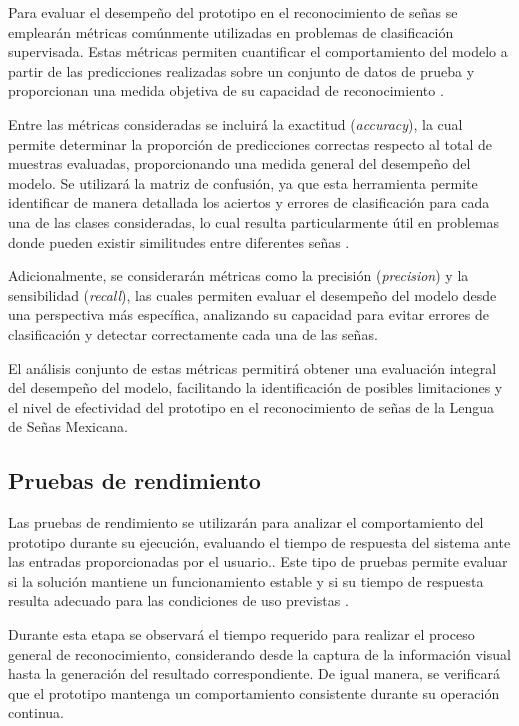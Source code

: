 	Para evaluar el desempeño del prototipo en el reconocimiento de señas se
	emplearán métricas comúnmente utilizadas en problemas de clasificación
	supervisada. Estas métricas permiten cuantificar el comportamiento del modelo
	a partir de las predicciones realizadas sobre un conjunto de datos de prueba
	y proporcionan una medida objetiva de su capacidad de reconocimiento
	\cite{bishop2006,geron2019}.
	
	Entre las métricas consideradas se incluirá la exactitud (\textit{accuracy}),
	la cual permite determinar la proporción de predicciones correctas respecto al
	total de muestras evaluadas, proporcionando una medida general del desempeño
	del modelo. Se utilizará la matriz de confusión, ya que esta
	herramienta permite identificar de manera detallada los aciertos y errores de
	clasificación para cada una de las clases consideradas, lo cual resulta
	particularmente útil en problemas donde pueden existir similitudes entre
	diferentes señas \cite{geron2019,goodfellow2016}.
	
	Adicionalmente, se considerarán métricas como la precisión (\textit{precision})
	y la sensibilidad (\textit{recall}), las cuales permiten evaluar el desempeño
	del modelo desde una perspectiva más específica, analizando su capacidad para
	evitar errores de clasificación y detectar correctamente cada una de las
	señas.
	
	El análisis conjunto de estas métricas permitirá obtener una evaluación
	integral del desempeño del modelo, facilitando la identificación de posibles
	limitaciones y el nivel de efectividad del prototipo en el reconocimiento de
	señas de la Lengua de Señas Mexicana.
	
	
	\subsection{Pruebas de rendimiento}
	
	Las pruebas de rendimiento se utilizarán para analizar el comportamiento del
	prototipo durante su ejecución, evaluando el tiempo de respuesta del sistema
	ante las entradas proporcionadas por el usuario.. Este tipo de pruebas permite
	evaluar si la solución mantiene un funcionamiento estable y si su tiempo de
	respuesta resulta adecuado para las condiciones de uso previstas
	\cite{pressman2014,sommerville2016}.
	
	Durante esta etapa se observará el tiempo requerido para realizar el proceso
	general de reconocimiento, considerando desde la captura de la información
	visual hasta la generación del resultado correspondiente. De igual manera, se
	verificará que el prototipo mantenga un comportamiento consistente durante su
	operación continua.
	
